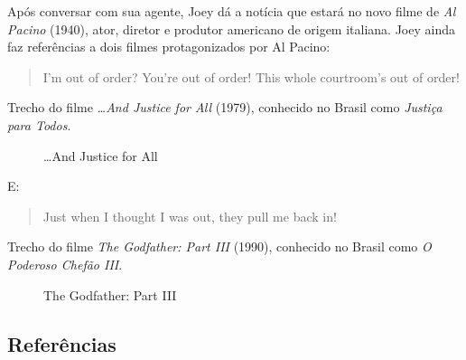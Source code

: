 Após conversar com sua agente, Joey dá a notícia que estará no novo
filme de \emph{Al Pacino} (1940), ator, diretor e produtor americano de
origem italiana. Joey ainda faz referências a dois filmes protagonizados
por Al Pacino:

\begin{quote}
I'm out of order? You're out of order! This whole courtroom's out of
order!
\end{quote}

Trecho do filme \emph{\ldots And Justice for All} (1979), conhecido no
Brasil como \emph{Justiça para Todos}.

\begin{figure}
  \centering
    \caption{…And Justice for All\label{fig:and-justice-for-all}}
\end{figure}

E:

\begin{quote}
Just when I thought I was out, they pull me back in!
\end{quote}

Trecho do filme \emph{The Godfather: Part III} (1990), conhecido no
Brasil como \emph{O Poderoso Chefão III}.

\begin{figure}
  \centering
    \caption{The Godfather: Part III\label{fig:the-godfather-part-iii}}
\end{figure}

\hypertarget{referuxeancias-3}{%
\subsection{Referências}\label{referuxeancias-3}}

